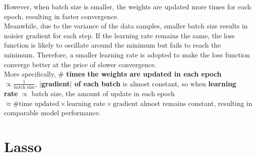 \documentclass{article}
\begin{document}
        However, when batch size is smaller, the weights are updated more times for each epoch, resulting in faster convergence.\\
        Meanwhile, due to the variance of the data samples, smaller batch size results in noisier gradient for each step.
        If the learning rate remains the same, the loss function is likely to oscillate around the minimum but fails to reach the minimum.
        Therefore, a smaller learning rate is adopted to make the loss function converge better at the price of slower convergence.\\
        More specifically, \# \textbf{times the weights are updated in each epoch} $\propto \frac{1}{\text{batch size}}$, 
        \textbf{$|$gradient$|$ of each batch} is almost constant, 
        so when \textbf{learning rate} $\propto$ batch size, 
        the amount of update in each epoch $\approx \#\text{time updated}\times\text{learning rate}\times\text{gradient}$ almost remains constant,
        resulting in comparable model performance.



    \section{Lasso}
\end{document}
